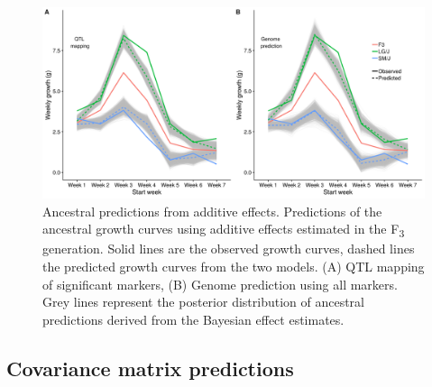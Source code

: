 \begin{refsection}
\begin{figure}
\includegraphics[width=\linewidth]{chapter_JoH-Melo_etal/media/growth_LG_SM_F3_predictions.png}
\caption[Ancestral predictions from additive effects]{Ancestral predictions from additive effects.
Predictions of the ancestral growth curves using additive effects
estimated in the F\textsubscript{3} generation. Solid lines are the
observed growth curves, dashed lines the predicted growth curves from
the two models. (A) QTL mapping of significant markers, (B) Genome
prediction using all markers. Grey lines represent the posterior
distribution of ancestral predictions derived from the Bayesian effect
estimates.}
\label{fig:joh:ancestral}
\end{figure}

\subsection{Covariance matrix predictions}


\end{refsection}
